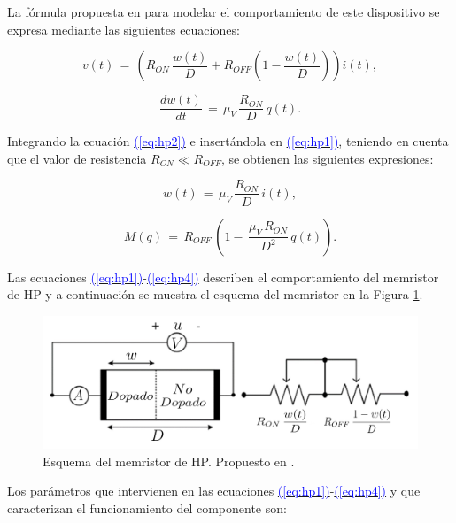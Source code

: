 \documentclass[12pt,a4paper]{report} %
\newcommand{\eref}[1]{\hyperref[#1]{\textcolor{blue}{(\ref*{#1})}}}
\begin{document}
	\vspace{0.5cm}La fórmula propuesta en \cite{HP} para modelar el comportamiento de este dispositivo se expresa mediante las siguientes ecuaciones:
	
	\begin{equation}
		v(t)\,=\,\left(R_{ON}\,\frac{w(t)}{D}+R_{OFF}\left(1-\frac{w(t)}{D}\right)\right)i(t),
		\label{eq:hp1}
	\end{equation}\smallskip
	
	\begin{equation}
		\frac{dw(t)}{dt}\,=\,\mu_V\,\frac{R_{ON}}{D}\,q(t).
		\label{eq:hp2}
	\end{equation}\smallskip
	
	\noindent Integrando la ecuación \eref{eq:hp2} e insertándola en \eref{eq:hp1}, teniendo en cuenta que el valor de resistencia $R_{ON} \ll R_{OFF}$, se obtienen las siguientes expresiones:
	
	\begin{equation}
		w(t)\,=\,\mu_V\,\frac{R_{ON}}{D}\,i(t),
		\label{eq:hp3}
	\end{equation}\smallskip
	
	\begin{equation}
		M(q)\,=\,R_{OFF}\,\left(1-\,\frac{\mu_V\,R_{ON}}{D^2}\,q(t)\right).
		\label{eq:hp4}
	\end{equation}\smallskip
	
	 Las ecuaciones \eref{eq:hp1}-\eref{eq:hp4} describen el comportamiento del memristor de HP y a continuación se muestra el esquema del memristor en la Figura \ref{fig:2021}.
	 
	 \newpage
	
	\vspace{0.5cm}\begin{figure}[h]
		\centering
		\includegraphics[width=1\textwidth]{schmem.jpg}
		\caption{Esquema del memristor de HP. Propuesto en \cite{2021}.}
		\label{fig:2021}
	\end{figure}\smallskip
	
	 \vspace{0.5cm}Los parámetros que intervienen en las ecuaciones \eref{eq:hp1}-\eref{eq:hp4} y que caracterizan el funcionamiento del componente son:
	
\end{document}
